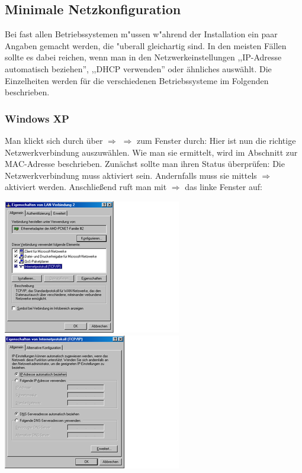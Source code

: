 
\subsection{Minimale Netzkonfiguration}
Bei fast allen Betriebssystemen m"ussen w"ahrend der Installation ein paar
Angaben gemacht werden, die "uberall gleichartig sind. In den meisten
Fällen sollte es dabei reichen, wenn man in den Netzwerkeinstellungen
,,IP-Adresse automatisch beziehen'', ,,DHCP verwenden'' oder ähnliches
auswählt. Die Einzelheiten werden für die verschiedenen
Betriebssysteme im Folgenden beschrieben.
\subsubsection{Windows XP}
Man klickt sich durch  über  $\Rightarrow$
 $\Rightarrow$  zum Fenster
 durch:
Hier ist nun die richtige Netzwerkverbindung auszuwählen. Wie man sie
ermittelt, wird im Abschnitt zur MAC-Adresse beschrieben. Zunächst
sollte man ihren Status überprüfen:  Die Netzwerkverbindung muss
aktiviert sein. Andernfalls muss sie mittels
$\Rightarrow$ aktiviert
werden.  Anschließend ruft man mit
$\Rightarrow$ das linke Fenster auf:  
\begin{center}
\includegraphics{eigenschaften_xp}\includegraphics{dhcp_xp}    
\end{center}
 

